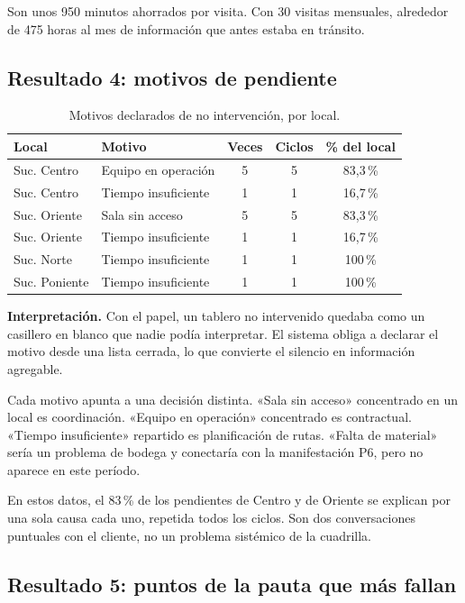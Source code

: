 \documentclass[10pt,letterpaper]{article}
\begin{document}
Son unos 950 minutos ahorrados por visita. Con 30 visitas mensuales, alrededor
de 475 horas al mes de información que antes estaba en tránsito.

\subsection{Resultado 4: motivos de pendiente}

\begin{table}[H]
\centering
\small
\begin{tabular}{@{}llccc@{}}
\toprule
\textbf{Local} & \textbf{Motivo} & \textbf{Veces} & \textbf{Ciclos} & \textbf{\% del local} \\
\midrule
Suc. Centro   & Equipo en operación  & 5 & 5 & 83,3\,\% \\
Suc. Centro   & Tiempo insuficiente  & 1 & 1 & 16,7\,\% \\
Suc. Oriente  & Sala sin acceso      & 5 & 5 & 83,3\,\% \\
Suc. Oriente  & Tiempo insuficiente  & 1 & 1 & 16,7\,\% \\
Suc. Norte    & Tiempo insuficiente  & 1 & 1 & 100\,\% \\
Suc. Poniente & Tiempo insuficiente  & 1 & 1 & 100\,\% \\
\bottomrule
\end{tabular}
\caption{Motivos declarados de no intervención, por local.}
\end{table}

\textbf{Interpretación.} Con el papel, un tablero no intervenido quedaba como
un casillero en blanco que nadie podía interpretar. El sistema obliga a
declarar el motivo desde una lista cerrada, lo que convierte el silencio en
información agregable.

Cada motivo apunta a una decisión distinta. «Sala sin acceso» concentrado en un
local es coordinación. «Equipo en operación» concentrado es contractual.
«Tiempo insuficiente» repartido es planificación de rutas. «Falta de material»
sería un problema de bodega y conectaría con la manifestación P6, pero no
aparece en este período.

En estos datos, el 83\,\% de los pendientes de Centro y de Oriente se explican
por una sola causa cada uno, repetida todos los ciclos. Son dos conversaciones
puntuales con el cliente, no un problema sistémico de la cuadrilla.

\subsection{Resultado 5: puntos de la pauta que más fallan}
\end{document}
